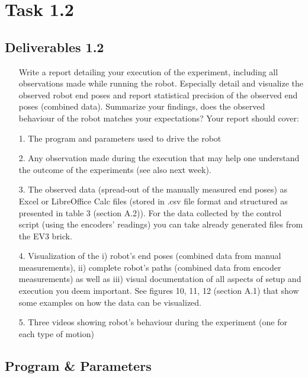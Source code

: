 

    \chapter{Task 1.2}
    \section{Deliverables 1.2}
    \begin{itemize}
        \item[] Write a report detailing your execution of the experiment, including all observations made while running the robot. Especially detail and visualize the observed robot end poses and report statistical precision of the observed end poses (combined data). Summarize your findings, does the observed behaviour of the robot matches your expectations? Your report should cover:
    \end{itemize}
    
    \begin{itemize}
        \item[1.] The program and parameters used to drive the robot
        \item[2.] Any observation made during the execution that may help one understand the outcome of the experiments (see also next week).
        \item[3.] The observed data (spread-out of the manually measured end poses) as Excel or LibreOffice Calc files (stored in .csv file format and structured as presented in table 3 (section A.2)). For the data collected by the control script (using the encoders’ readings) you can take already generated files from the EV3 brick.
        \item[4.] Visualization of the i) robot’s end poses (combined data from manual measurements), ii) complete robot’s paths (combined data from encoder measurements) as well as iii) visual documentation of all aspects of setup and execution you deem important. See figures 10, 11, 12 (section A.1) that show some examples on how the data can be visualized.
        \item[5.] Three videos showing robot’s behaviour during the experiment (one for each type of motion)
    \end{itemize}
    
    \section{Program \& Parameters}
    
